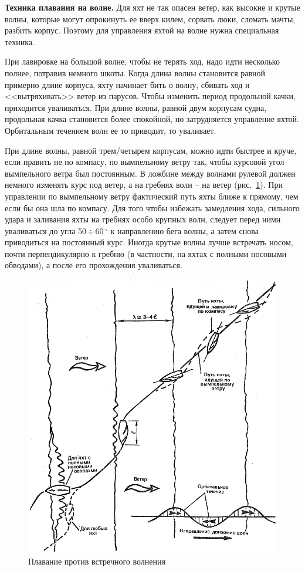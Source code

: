 \documentclass[a4paper, 12pt, twoside, final, book, russian, fittopage, cyremdash]{ncc}
\newcommand{\gr}{\ensuremath{\,^\circ}\xspace}
\newcommand{\otdo}{\,\ensuremath{\div}\,}
\newcommand{\ris}[1]{\ref{fig:#1}}
\begin{document}
\textbf{Техника плавания на волне.} Для яхт не так опасен ветер, как высокие и крутые волны, которые могут опрокинуть ее вверх килем, сорвать люки, сломать мачты, разбить корпус. Поэтому для управления яхтой на волне нужна специальная техника.

При лавировке на большой волне, чтобы не терять ход, надо идти несколько полнее, потравив немного шкоты. Когда длина волны становится равной примерно длине корпуса, яхту начинает бить о волну, сбивать ход и <<вытряхивать>> ветер из парусов. Чтобы изменить период продольной качки, приходится уваливаться. При длине волны, равной двум корпусам судна, продольная качка становится более спокойной, но затрудняется управление яхтой. Орбитальным течением волн ее то приводит, то уваливает.

При длине волны, равной трем\-/четырем корпусам, можно идти быстрее и круче, если править не по компасу, по вымпельному ветру так, чтобы курсовой угол вымпельного ветра был постоянным. В ложбине между волнами рулевой должен немного изменять курс под ветер, а на гребнях волн \--- на ветер (рис.~\ris{128}). При управлении по вымпельному ветру фактический путь яхты ближе к прямому, чем если бы она шла по компасу. Для того чтобы избежать замедления хода, сильного удара и заливания яхты на гребнях особо крупных волн, следует перед ними уваливаться до угла 50\otdo 60\gr к направлению бега волны, а затем снова приводиться на постоянный курс. Иногда крутые волны лучше встречать носом, почти перпендикулярно к гребню (в частности, на яхтах с полными носовыми обводами), а после его прохождения уваливаться.

\begin{figure}[htb]
  \centering{}
  \includegraphics[scale=1.3]{0128P}
  \caption{Плавание против встречного волнения}
  \label{fig:128}
\end{figure}
\end{document}
